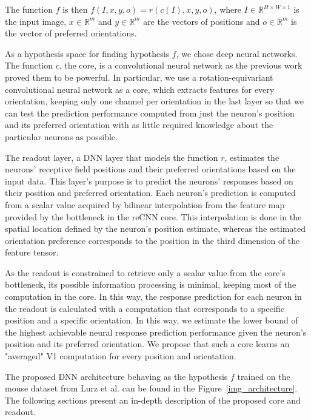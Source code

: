 The function $f$ is then ${f(I, x, y, o) = r(c(I), x, y, o)}$, where $I \in \mathbb{R}^{H \times W \times 1}$ is the input image, $x \in \mathbb{R}^m$ and $y \in \mathbb{R}^m$ are the vectors of positions and $o \in \mathbb{R}^m$ is the vector of preferred orientations.


As a hypothesis space for finding hypothesis $f$, we chose deep neural networks. The function $c$, the core, is a convolutional neural network as the previous work proved them to be powerful. In particular, we use a rotation-equivariant convolutional neural network as a core, which extracts features for every orientation, keeping only one channel per orientation in the last layer so that we can test the prediction performance computed from just the neuron’s position and its preferred orientation with as little required knowledge about the particular neurons as possible. 

The readout layer, a DNN layer that models the function $r$, estimates the neurons’ receptive field positions and their preferred orientations based on the input data. This layer’s purpose is to predict the neurons’ responses based on their position and preferred orientation. Each neuron’s prediction is computed from a scalar value acquired by bilinear interpolation from the feature map provided by the bottleneck in the reCNN core. This interpolation is done in the spatial location defined by the neuron’s position estimate, whereas the estimated orientation preference corresponds to the position in the third dimension of the feature tensor.

As the readout is constrained to retrieve only a scalar value from the core’s bottleneck, its possible information processing is minimal, keeping most of the computation in the core. In this way, the response prediction for each neuron in the readout is calculated with a computation that corresponds to a specific position and a specific orientation. In this way, we estimate the lower bound of the highest achievable neural response prediction performance given the neuron’s position and its preferred orientation. We propose that such a core learns an "averaged" V1 computation for every position and orientation.

The proposed DNN architecture behaving as the hypothesis $f$ trained on the mouse dataset from Lurz et al. \citep{lurz2021generalization} can be found in the Figure~\ref{img_architecture}. The following sections present an in-depth description of the proposed core and readout.

